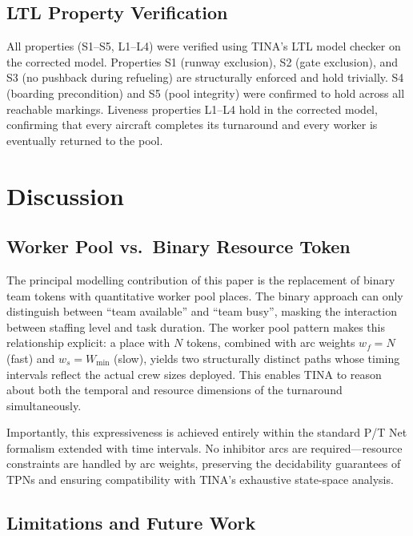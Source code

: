 \documentclass[conference,a4paper]{IEEEtran}
\begin{document}
\subsection{LTL Property Verification}

All properties (S1--S5, L1--L4) were verified using TINA's LTL model checker
on the corrected model. Properties S1 (runway exclusion), S2 (gate
exclusion), and S3 (no pushback during refueling) are structurally enforced
and hold trivially. S4 (boarding precondition) and S5 (pool integrity) were
confirmed to hold across all reachable markings. Liveness properties L1--L4
hold in the corrected model, confirming that every aircraft completes its
turnaround and every worker is eventually returned to the pool.

\section{Discussion}

\subsection{Worker Pool vs.\ Binary Resource Token}

The principal modelling contribution of this paper is the replacement of
binary team tokens with quantitative worker pool places. The binary approach
can only distinguish between ``team available'' and ``team busy'', masking
the interaction between staffing level and task duration. The worker pool
pattern makes this relationship explicit: a place with $N$ tokens, combined
with arc weights $w_f = N$ (fast) and $w_s = W_{\min}$ (slow), yields two
structurally distinct paths whose timing intervals reflect the actual crew
sizes deployed. This enables TINA to reason about both the temporal and
resource dimensions of the turnaround simultaneously.

Importantly, this expressiveness is achieved entirely within the standard
P/T Net formalism extended with time intervals. No inhibitor arcs are
required---resource constraints are handled by arc weights, preserving the
decidability guarantees of TPNs and ensuring compatibility with TINA's
exhaustive state-space analysis.

\subsection{Limitations and Future Work}
\end{document}
